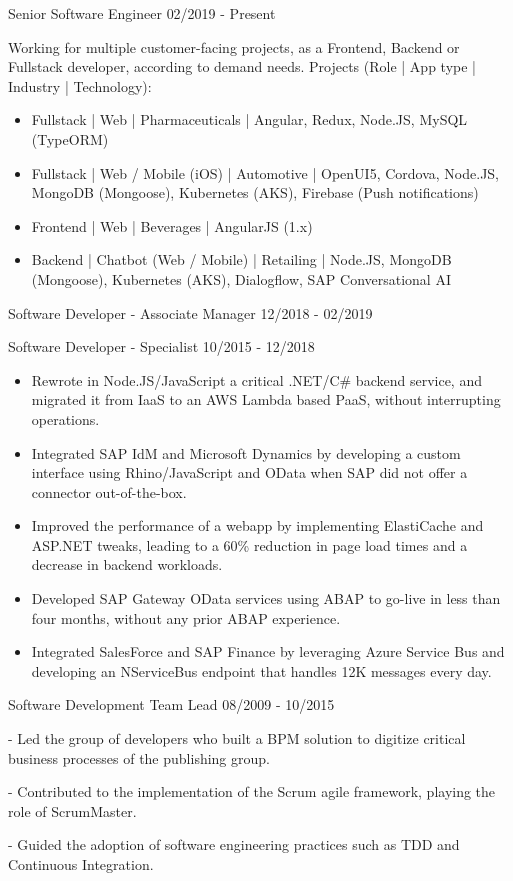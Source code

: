 \documentclass[11pt]{article} %
\begin{document}
\begin{description}
\squish
{}
           {Senior Software Engineer}
           {02/2019 - Present}

Working for multiple customer-facing projects, as a Frontend, Backend or Fullstack developer, according to demand needs.
\vskip 0.1in
Projects (Role | App type | Industry | Technology):
\begin{itemize}
\item Fullstack | Web | Pharmaceuticals | Angular, Redux, Node.JS, MySQL (TypeORM)
\item Fullstack | Web / Mobile (iOS) | Automotive | OpenUI5, Cordova, Node.JS, MongoDB (Mongoose), Kubernetes (AKS), Firebase (Push notifications)
\item Frontend | Web | Beverages | AngularJS (1.x)
\item Backend | Chatbot (Web / Mobile) | Retailing | Node.JS, MongoDB (Mongoose), Kubernetes (AKS), Dialogflow, SAP Conversational AI
\end{itemize}

           {Software Developer - Associate Manager}
           {12/2018 - 02/2019}

           {Software Developer - Specialist}
           {10/2015 - 12/2018}

\begin{itemize}
\item Rewrote in Node.JS/JavaScript a critical .NET/C\# backend service, and migrated it from IaaS to an AWS Lambda based PaaS, without interrupting operations.
\item Integrated SAP IdM and Microsoft Dynamics by developing a custom interface using Rhino/JavaScript and OData when SAP did not offer a connector out-of-the-box.
\item Improved the performance of a webapp by implementing ElastiCache and ASP.NET tweaks, leading to a 60\% reduction in page load times and a decrease in backend workloads.
\item Developed SAP Gateway OData services using ABAP to go-live in less than four months, without any prior ABAP experience.
\item Integrated SalesForce and SAP Finance by leveraging Azure Service Bus and developing an NServiceBus endpoint that handles 12K messages every day.
\end{itemize}

           {Software Development Team Lead}
           {08/2009 - 10/2015}

- Led the group of developers who built a BPM solution to digitize critical business processes of the publishing group.

- Contributed to the implementation of the Scrum agile framework, playing the role of ScrumMaster.

- Guided the adoption of software engineering practices such as TDD and Continuous Integration.

\end{description}
\end{document}

